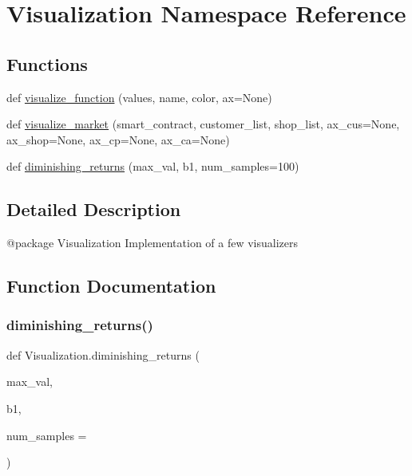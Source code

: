 \hypertarget{namespace_visualization}{}\section{Visualization Namespace Reference}
\label{namespace_visualization}
\subsection*{Functions}
\begin{DoxyCompactItemize}
\item 
def \mbox{\hyperlink{namespace_visualization_a6e47cd3e3c863758dc8c30a9f27330f0}{visualize\+\_\+function}} (values, name, color, ax=None)
\item 
def \mbox{\hyperlink{namespace_visualization_a293d9622a724c53c2d8d3e09bb9721c6}{visualize\+\_\+market}} (smart\+\_\+contract, customer\+\_\+list, shop\+\_\+list, ax\+\_\+cus=None, ax\+\_\+shop=None, ax\+\_\+cp=None, ax\+\_\+ca=None)
\item 
def \mbox{\hyperlink{namespace_visualization_a02f7aadcda80e9aca64ca6aeb1843803}{diminishing\+\_\+returns}} (max\+\_\+val, b1, num\+\_\+samples=100)
\end{DoxyCompactItemize}


\subsection{Detailed Description}
\begin{DoxyVerb}@package Visualization
Implementation of a few visualizers
\end{DoxyVerb}
 

\subsection{Function Documentation}
\mbox{\label{namespace_visualization_a02f7aadcda80e9aca64ca6aeb1843803}} 
\subsubsection{\texorpdfstring{diminishing\+\_\+returns()}{diminishing\_returns()}}
{\footnotesize\ttfamily def Visualization.\+diminishing\+\_\+returns (\begin{DoxyParamCaption}\item[{}]{max\+\_\+val,  }\item[{}]{b1,  }\item[{}]{num\+\_\+samples = {} }\end{DoxyParamCaption})}

